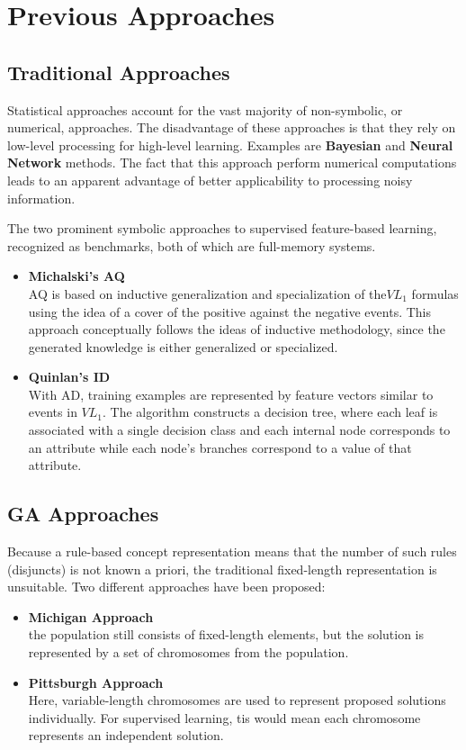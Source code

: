 \documentclass[../main.tex]{subfiles}
\begin{document}
\section{Previous Approaches}

\subsection{Traditional Approaches}
Statistical approaches account for the vast majority of non-symbolic, or numerical, approaches. The disadvantage of
these approaches is that they rely on low-level processing for high-level learning. Examples are \textbf{Bayesian} and
\textbf{Neural Network} methods. The fact that this approach perform numerical computations leads to an
apparent advantage of better applicability to processing noisy information.

The two prominent symbolic approaches to supervised feature-based learning, recognized
as benchmarks, both of which are full-memory systems.

\begin{itemize}
	\item \textbf{Michalski's AQ} \\
	AQ is based on inductive generalization and specialization of the$VL_1$ formulas using the idea of a cover of the
	positive against the negative events. This approach conceptually follows the ideas of inductive methodology, since
	the generated knowledge is either generalized or specialized.
	\item \textbf{Quinlan's  ID} \\
	With AD, training examples are represented by feature vectors similar to events in $VL_1$.  The algorithm
	constructs a decision tree, where each leaf is associated with a single decision class and each internal node
	corresponds to an attribute while each node's branches correspond to a value of that attribute.
\end{itemize}

\subsection{GA Approaches}
Because a rule-based concept representation means that the number of such rules (disjuncts) is not known a priori,  the
traditional fixed-length representation is unsuitable. Two different approaches have been proposed:

\begin{itemize}
	\item \textbf{Michigan Approach} \\
	the population still consists of fixed-length elements, but the solution is represented by a set of chromosomes
	from the population.
	\item \textbf{Pittsburgh Approach} \\
	Here, variable-length chromosomes are used to represent proposed solutions individually. For supervised learning,
	tis would mean each chromosome represents an independent solution.
\end{itemize}
\end{document}
